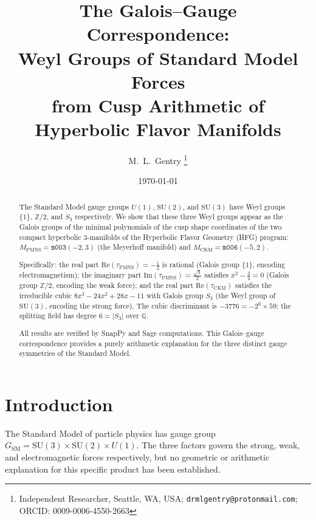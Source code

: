 \documentclass[11pt,a4paper]{article}
\theoremstyle{definition}
\theoremstyle{remark}
\newcommand{\mfld}[1]{\texttt{#1}}
\begin{document}
\title{The Galois--Gauge Correspondence:\\
Weyl Groups of Standard Model Forces\\
from Cusp Arithmetic of Hyperbolic Flavor Manifolds}

\author{M.~L.~Gentry%
\thanks{Independent Researcher, Seattle, WA, USA;
\texttt{drmlgentry@protonmail.com};
ORCID: 0009-0006-4550-2663}}
\date{\today}
\maketitle

\begin{abstract}
The Standard Model gauge groups $U(1)$, $\mathrm{SU}(2)$, and
$\mathrm{SU}(3)$ have Weyl groups $\{1\}$, $\mathbb{Z}/2$, and $S_3$
respectively.
We show that these three Weyl groups appear as the Galois groups of
the minimal polynomials of the cusp shape coordinates of the two
compact hyperbolic 3-manifolds of the Hyperbolic Flavor Geometry (HFG)
program: $M_{\mathrm{PMNS}}=\mfld{m003}(-2,3)$ (the Meyerhoff manifold)
and $M_{\mathrm{CKM}}=\mfld{m006}(-5,2)$.

Specifically:
the real part $\mathrm{Re}(\tau_{\mathrm{PMNS}})=-\tfrac12$ is rational
(Galois group $\{1\}$, encoding electromagnetism);
the imaginary part $\mathrm{Im}(\tau_{\mathrm{PMNS}})=\tfrac{\sqrt3}{2}$
satisfies $x^2-\tfrac34=0$ (Galois group $\mathbb{Z}/2$, encoding the
weak force);
and the real part $\mathrm{Re}(\tau_{\mathrm{CKM}})$ satisfies the
irreducible cubic $8x^3-24x^2+28x-11$ with Galois group $S_3$
(the Weyl group of $\mathrm{SU}(3)$, encoding the strong force).
The cubic discriminant is $-3776=-2^6\times59$; the splitting field
has degree $6=|S_3|$ over $\mathbb{Q}$.

All results are verified by SnapPy and Sage computations.
This Galois--gauge correspondence provides a purely arithmetic
explanation for the three distinct gauge symmetries of the
Standard Model.
\end{abstract}

\section{Introduction}
\label{sec:intro}

The Standard Model of particle physics has gauge group
$G_{\mathrm{SM}}=\mathrm{SU}(3)\times\mathrm{SU}(2)\times U(1)$.
The three factors govern the strong, weak, and electromagnetic forces
respectively, but no geometric or arithmetic explanation for this
specific product has been established.
\end{document}
